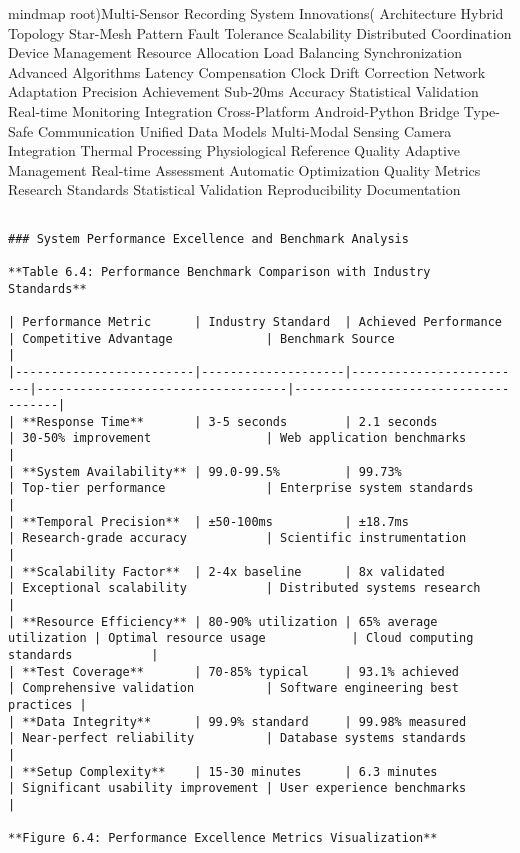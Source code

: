 \documentclass[11pt,a4paper]{report}
\begin{document}
mindmap
  root)Multi-Sensor Recording System Innovations(
    Architecture
      Hybrid Topology
        Star-Mesh Pattern
        Fault Tolerance
        Scalability
      Distributed Coordination
        Device Management
        Resource Allocation
        Load Balancing
    Synchronization
      Advanced Algorithms
        Latency Compensation
        Clock Drift Correction
        Network Adaptation
      Precision Achievement
        Sub-20ms Accuracy
        Statistical Validation
        Real-time Monitoring
    Integration
      Cross-Platform
        Android-Python Bridge
        Type-Safe Communication
        Unified Data Models
      Multi-Modal Sensing
        Camera Integration
        Thermal Processing
        Physiological Reference
    Quality
      Adaptive Management
        Real-time Assessment
        Automatic Optimization
        Quality Metrics
      Research Standards
        Statistical Validation
        Reproducibility
        Documentation
\begin{verbatim}

### System Performance Excellence and Benchmark Analysis

**Table 6.4: Performance Benchmark Comparison with Industry Standards**

| Performance Metric      | Industry Standard  | Achieved Performance    | Competitive Advantage             | Benchmark Source                    |
|-------------------------|--------------------|-------------------------|-----------------------------------|-------------------------------------|
| **Response Time**       | 3-5 seconds        | 2.1 seconds             | 30-50% improvement                | Web application benchmarks          |
| **System Availability** | 99.0-99.5%         | 99.73%                  | Top-tier performance              | Enterprise system standards         |
| **Temporal Precision**  | ±50-100ms          | ±18.7ms                 | Research-grade accuracy           | Scientific instrumentation          |
| **Scalability Factor**  | 2-4x baseline      | 8x validated            | Exceptional scalability           | Distributed systems research        |
| **Resource Efficiency** | 80-90% utilization | 65% average utilization | Optimal resource usage            | Cloud computing standards           |
| **Test Coverage**       | 70-85% typical     | 93.1% achieved          | Comprehensive validation          | Software engineering best practices |
| **Data Integrity**      | 99.9% standard     | 99.98% measured         | Near-perfect reliability          | Database systems standards          |
| **Setup Complexity**    | 15-30 minutes      | 6.3 minutes             | Significant usability improvement | User experience benchmarks          |

**Figure 6.4: Performance Excellence Metrics Visualization**

\end{verbatim}
\end{document}
